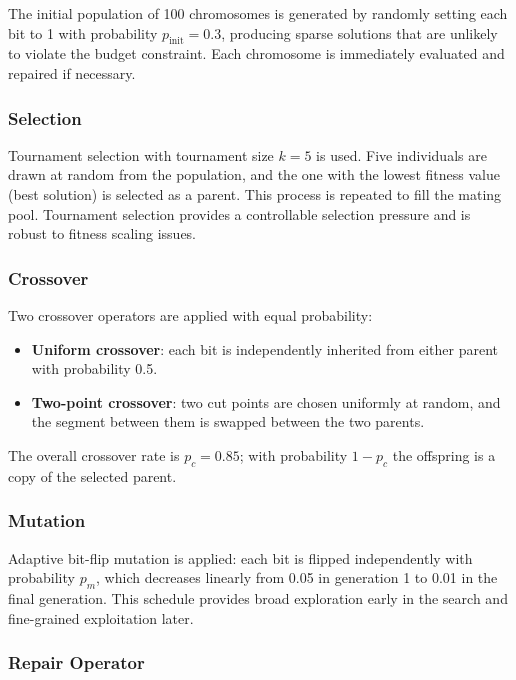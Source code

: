 \documentclass[12pt,a4paper]{article}
\begin{document}
The initial population of 100 chromosomes is generated by randomly setting each bit to 1 with probability $p_{\text{init}} = 0.3$, producing sparse solutions that are unlikely to violate the budget constraint.
Each chromosome is immediately evaluated and repaired if necessary.

\subsubsection*{Selection}

Tournament selection with tournament size $k = 5$ is used.
Five individuals are drawn at random from the population, and the one with the lowest fitness value (best solution) is selected as a parent.
This process is repeated to fill the mating pool.
Tournament selection provides a controllable selection pressure and is robust to fitness scaling issues.

\subsubsection*{Crossover}

Two crossover operators are applied with equal probability:
\begin{itemize}
  \item \textbf{Uniform crossover}: each bit is independently inherited from either parent with probability 0.5.
  \item \textbf{Two-point crossover}: two cut points are chosen uniformly at random, and the segment between them is swapped between the two parents.
\end{itemize}
The overall crossover rate is $p_c = 0.85$; with probability $1 - p_c$ the offspring is a copy of the selected parent.

\subsubsection*{Mutation}

Adaptive bit-flip mutation is applied: each bit is flipped independently with probability $p_m$, which decreases linearly from 0.05 in generation 1 to 0.01 in the final generation.
This schedule provides broad exploration early in the search and fine-grained exploitation later.

\subsubsection*{Repair Operator}
\end{document}
